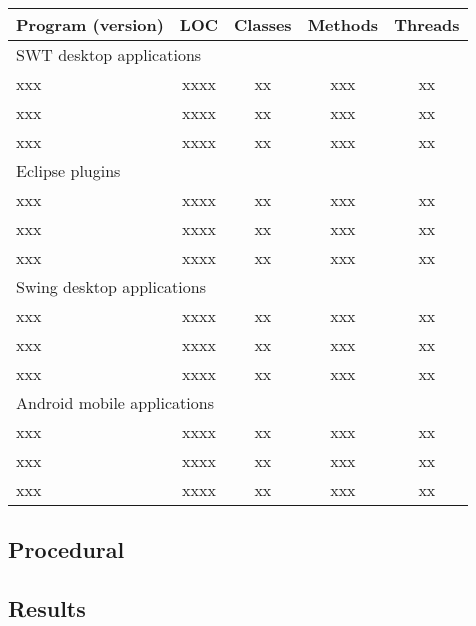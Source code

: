 \begin{table}[t]
\begin{center}
 \fontsize{9pt}{\baselineskip}\selectfont
\hspace*{-0.2cm}
\begin{tabular}{|l||c|c|c|c|}
\hline
 Program (version) & LOC & Classes & Methods & Threads \\
\hline \hline
\multicolumn{5}{|l|}{SWT desktop applications}   \\
 \hline
 xxx &  xxxx &  xx &  xxx & xx \\
 \hline
 xxx &  xxxx &  xx &  xxx & xx \\
 \hline
 xxx &  xxxx &  xx &  xxx & xx \\
 \hline
 \hline
\multicolumn{5}{|l|}{Eclipse plugins}   \\
 \hline
 xxx &  xxxx &  xx &  xxx & xx \\
 \hline
 xxx &  xxxx &  xx &  xxx & xx \\
 \hline
 xxx &  xxxx &  xx &  xxx & xx \\
 \hline
 \hline
\multicolumn{5}{|l|}{Swing desktop applications}   \\
 \hline
 xxx &  xxxx &  xx &  xxx & xx \\
 \hline
 xxx &  xxxx &  xx &  xxx & xx \\
 \hline
 xxx &  xxxx &  xx &  xxx & xx \\
 \hline
 \hline
\multicolumn{5}{|l|}{Android mobile applications}   \\
 \hline
 xxx &  xxxx &  xx &  xxx & xx \\
 \hline
 xxx &  xxxx &  xx &  xxx & xx \\
 \hline
 xxx &  xxxx &  xx &  xxx & xx \\
\hline
\end{tabular}
\end{center}
\vspace{-15pt}
\end{table}


\subsection{Procedural}

\subsection{Results}


